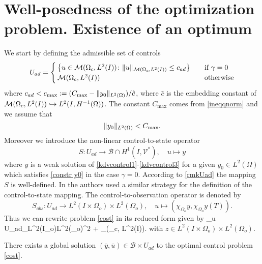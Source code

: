 \section{Well-posedness of the optimization problem. Existence of an optimum}\label{sec:ex opt}
We start by defining the admissible set of controls
$$U_{ad} = \begin{cases} \left\{u \in \mathcal{M}(\Omega_c, L^{2}(I))\colon \lVert u\rVert_{\mathcal{M}(\Omega_c, L^{2}(I))}\leq c_{ad} \right\} &\quad\mbox{if } \gamma = 0 \\
\mathcal{M}(\Omega_c, L^{2}(I)) & \quad \mbox{otherwise}
 \end{cases}$$
where $c_{ad}< c_{\max}:=(C_{\max}-\lVert y_0\rVert_{L^2(\Omega)})/\hat c$, where $\hat c$ is the embedding constant of $\M\hookrightarrow\Hm1$. The constant $C_{\max}$ comes from \eqref{ineqqnorm} and we assume that
\begin{equation}\label{constr y0}
\norm{y_0}_{L^2(\Omega)}< C_{\max}.
\end{equation}
Moreover we introduce the non-linear control-to-state operator
\begin{equation}
 S\colon U_{ad}\rightarrow \mathcal B\cap H^1(I,\mathcal V^\ast),\quad u\mapsto y
 \label{controltostate}
\end{equation}
where $y$ is a weak solution of \eqref{kdvcontrol1}-\eqref{kdvcontrol3} for a given $y_0\in L^2(\Omega)$ which satisfies
\eqref{constr y0} in the case $\gamma =0$. According to \cref{rmkUad} the mapping $S$ is well-defined. In \cite{ClasonKaltenbacher13} the authors used a similar strategy for the definition of the control-to-state mapping. The control-to-observation operator is denoted by
\[
S_{obs}\colon U_{ad}\rightarrow L^2(I\times \Omega_{o})\times L^2(\Omega_{o}),\quad u\mapsto(\chi_{\Omega_{o}}y,\chi_{\Omega_{o}}y(T)).
\]
Thus we can rewrite problem \eqref{cost} in its reduced form given by
\be
\min_{u \in U_{ad}}_{L^2(I\times \Omega_{o})\times L^2(\Omega_{o})}^2 + \alpha {}_{(\Omega_{c}, L^{2}(I))}.
\label{red cost}
\ee
with $z\in L^2(I\times \Omega_{o})\times L^2(\Omega_{o})$.
\begin{proposition}
There exists a global solution $(\bar y,\bar u) \in \mathcal B\times U_{ad}$ to the optimal control problem \eqref{cost}.
\end{proposition}
